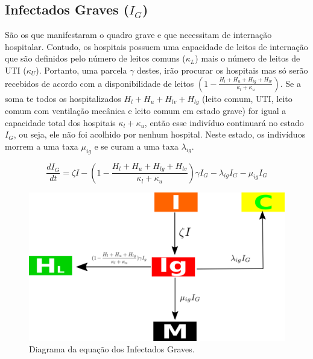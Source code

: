\documentclass[12pt,a4papper]{article}
\begin{document}
\subsection{Infectados Graves ($I_G$)}
São os que manifestaram o quadro grave e que necessitam de internação hospitalar. Contudo, os hospitais possuem uma capacidade de leitos de internação que são definidos pelo número de leitos comuns ($\kappa_L$) mais o número de leitos de UTI ($\kappa_U$). Portanto, uma parcela $\gamma$ destes, irão procurar os hospitais mas só serão recebidos de acordo com a disponibilidade de leitos $(1-\frac{H_l+H_u+H_{lg}+H_{lv}}{\kappa_l+\kappa_u})$. Se a soma te todos os hospitalizados  $H_l+H_u+H_{lv}+H_{lg}$ (leito comum, UTI, leito comum com ventilação mecânica e leito comum em estado grave) for igual a capacidade total dos hospitais $\kappa_l+\kappa_u$, então esse indivíduo continuará no estado $I_G$, ou seja, ele não foi acolhido por nenhum hospital. Neste estado, os indivíduos morrem a uma taxa $\mu_{ig}$ e se curam a uma taxa $\lambda_{ig}$. 

\begin{equation}
	\frac{dI_G}{dt}= \zeta I -(1-\frac{H_l+H_u+H_{lg}+H_{lv}}{\kappa_l+\kappa_u})\gamma I_G - \lambda_{ig} I_G - \mu_{ig} I_G
\end{equation}
\begin{figure}[!h]
	\centering
	\includegraphics[scale=0.4]{covidIg}
	\caption{Diagrama da equação dos Infectados Graves.}
	\label{fig:universe}
\end{figure}
\end{document}
